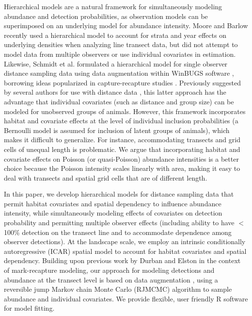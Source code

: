\documentclass[10pt]{article}
\begin{document}
Hierarchical models are a natural framework for simultaneously modeling abundance and detection probabilities, as observation models can be superimposed on an underlying model for abundance intensity.  Moore and Barlow \cite{MooreBarlow2011} recently used a hierarchical model to account for strata and year effects on underlying densities when analyzing line transect data, but did not attempt to model data from multiple observers or use individual covariates in estimation. Likewise, Schmidt et al. \cite{SchmidtEtAl2012} formulated a hierarchical model for single observer distance sampling data using data augmentation within WinBUGS software \cite{LunnEtAl2000}, borrowing ideas popularized in capture-recapture studies \cite{RoyleEtAl2007b,RoyleDorazio2008,Royle2009}.  Previously suggested by several authors for use with distance data \cite{RoyleDorazio2008,LinkBarker2010}, this latter approach has the advantage that individual covariates (such as distance and group size) can be modeled for unobserved groups of animals.
However, this framework incorporates habitat and covariate effects at the level of individual inclusion probabilities (a Bernoulli model is assumed for inclusion of latent groups of animals), which makes it difficult to generalize.  For instance, accommodating transects and grid cells of unequal length is problematic. We argue that incorporating habitat and covariate effects on Poisson (or quasi-Poisson) abundance intensities is a better choice because the Poisson intensity scales linearly with area, making it easy to deal with transects and spatial grid cells that are of different length.

In this paper, we develop hierarchical models for distance sampling data that permit habitat covariates and spatial dependency to influence abundance intensity, while simultaneously modeling effects of covariates on detection probability and permitting multiple observer effects (including ability to have $<$100\% detection on the transect line and to accommodate dependence among observer detections).  At the landscape scale, we employ an intrinsic conditionally autoregressive (ICAR) spatial model \cite{BesagEtAl1991,BesagKooperberg1995,RueHeld2005} to account for habitat covariates and spatial dependency.  Building upon previous work by Durban and Elston \cite{DurbanElston2005} in the context of mark-recapture modeling, our approach for modeling detections and abundance at the transect level is based on data augmentation \cite{TannerWong1987,RoyleEtAl2007b}, using a reversible jump Markov chain Monte Carlo (RJMCMC) algorithm \cite{CarlinChib1995,Green1995} to sample abundance and individual covariates. We provide flexible, user friendly R software for model fitting.
\end{document}
